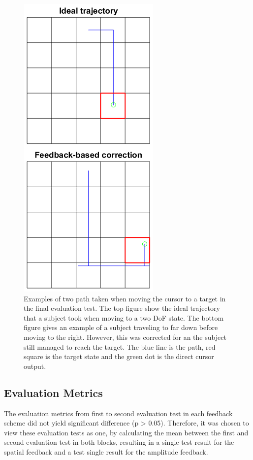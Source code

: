 \begin{figure}[h]                 
	\includegraphics[width=.7\textwidth]{figures/trajectories}
	\caption{Examples of two path taken when moving the cursor to a target in the final evaluation test. The top figure show the ideal trajectory that a subject took when moving to a two DoF state. The bottom figure gives an example of a subject traveling to far down before moving to the right. However, this was corrected for an the subject still managed to reach the target. The blue line is the path, red square is the target state and the green dot is the direct cursor output.}
	\label{fig:pa:trajec} 
\end{figure}

\subsection{Evaluation Metrics}
The evaluation metrics from first to second evaluation test in each feedback scheme did not yield significant difference (p > 0.05). Therefore, it was chosen to view these evaluation tests as one, by calculating the mean between the first and second evaluation test in both blocks, resulting in a single test result for the spatial feedback and a test single result for the amplitude feedback. 

